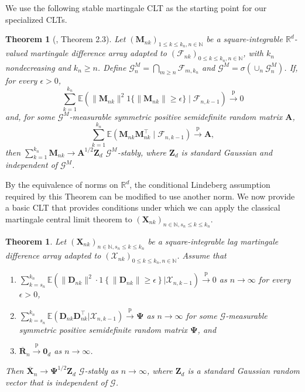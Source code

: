 \documentclass[11pt]{article}
\renewcommand\vec[1]{\boldsymbol{#1}}
\newcommand\mat[1]{\mathbf{#1}}
\newcommand{\E}{\mathbb{E}}
\newcommand{\R}{\mathbb{R}}
\newcommand{\N}{\mathbb{N}}
\newcommand{\G}{\mathcal{G}}
\newcommand{\X}{\mathcal{X}}
\newcommand{\labeleditem}[1]{%
  \item[$\mathrm{(}$\csname cond#1\endcsname$\mathrm{)}$]%
  \hypertarget{cond:#1}{}%
}
\newcommand{\pconverge}{\overset{\mathrm{p}}{\to}}
\newtheorem{theorem}{Theorem}
\newtheorem*{externaltheorem}{Theorem}
\theoremstyle{definition}
\begin{document}
We use the following stable martingale CLT as the starting point for our specialized CLTs.
\begin{externaltheorem}[\citet{hausler_stable_2024}, Theorem 2.3]\label{thm:external-hl}
Let \((\vec M_{nk})_{1\leq k\leq k_n,n\in\N}\) be a square-integrable \(\R^d\)-valued martingale difference array adapted to \((\mathcal F_{nk})_{0\leq k\leq k_n,n\in\N}\), with \(k_n\) nondecreasing and \(k_n\geq n\).
Define \(\mathcal G_n^M=\bigcap_{m\geq n}\mathcal F_{m,k_n}\) and \(\mathcal G^M=\sigma(\cup_n\mathcal G_n^M)\).
If, for every \(\epsilon>0\),
\[
\sum_{k=1}^{k_n}
\E\left(
\|\vec M_{nk}\|^2
1\{\|\vec M_{nk}\|\geq\epsilon\}
\mid\mathcal F_{n,k-1}
\right)
\pconverge0
\]
and, for some \(\mathcal G^M\)-measurable symmetric positive semidefinite random matrix \(\mat A\),
\[
\sum_{k=1}^{k_n}
\E(\vec M_{nk}\vec M_{nk}^{\top}\mid\mathcal F_{n,k-1})
\pconverge\mat A,
\]
then \(\sum_{k=1}^{k_n}\vec M_{nk}\to\mat A^{1/2}\vec Z_d\) \(\mathcal G^M\)-stably, where \(\vec Z_d\) is standard Gaussian and independent of \(\mathcal G^M\).
\end{externaltheorem}

By the equivalence of norms on $\R^d$, the conditional Lindeberg assumption required by this Theorem can be modified to use another norm.
We now provide a basic CLT that provides conditions under which we can apply the classical martingale central limit theorem to $(\vec{X}_{nk})_{n \in \N, s_n \leq k \leq k_n}$.

\begin{theorem} \label{thm:basic-clt}
Let $(\vec{X}_{nk})_{n \in \N, s_n \leq k \leq k_n}$ be a square-integrable lag martingale difference array adapted to $(\X_{nk})_{0 \leq k \leq k_n, n \in \N}$.
Assume that
\begin{enumerate}
    \labeleditem{CLB} $\sum_{k=s_n}^{k_n} \E\left(\big\|\vec{D}_{nk}\big\|^2 \cdot 1\left\{\big\|\vec{D}_{nk}\big\| \geq \epsilon\right\} \Big| \X_{n,k-1}\right) \pconverge 0$ as $n \to \infty$ for every $\epsilon > 0$,
    \labeleditem{N} $\sum_{k=s_n}^{k_n} \E(\vec{D}_{nk} \vec{D}_{nk}^{\top} | \X_{n,k-1}) \pconverge \mat{\Psi}$ as $n \to \infty$ for some $\G$-measurable symmetric positive semidefinite random matrix $\mat{\Psi}$, and
    \labeleditem{R} $\overline{\vec{R}}_n \pconverge \vec{0}_d$ as $n \to \infty$.
\end{enumerate}
Then $\overline{\vec{X}}_n \to \mat{\Psi}^{1/2} \vec{Z}_d$ $\G$-stably as $n \to \infty$, where $\vec{Z}_d$ is a standard Gaussian random vector that is independent of $\G$.
\end{theorem}
\end{document}

